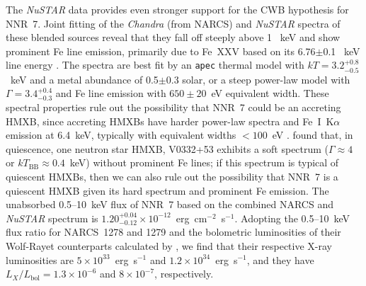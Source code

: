 \documentclass[iop,revtex4]{emulateapj}
\begin{document}
The \textit{NuSTAR} data provides even stronger support for the CWB hypothesis for NNR~7.  Joint fitting of the \textit{Chandra} (from NARCS) and \textit{NuSTAR} spectra of these blended sources reveal that they fall off steeply above 1~ keV and show prominent Fe line emission, primarily due to Fe~XXV based on its 6.76$\pm$0.1~ keV line energy \citep{house69}.  The spectra are best fit by an \texttt{apec} thermal model with $kT=3.2^{+0.8}_{-0.5}$~keV and a metal abundance of 0.5$\pm$0.3 solar, or a steep power-law model with $\Gamma=3.4^{+0.4}_{-0.3}$ and Fe line emission with $650\pm20$~eV equivalent width.  These spectral properties rule out the possibility that NNR~7 could be an accreting HMXB, since accreting HMXBs have harder power-law spectra and Fe~I~K$\alpha$ emission at 6.4~keV, typically with equivalent widths $<100$~eV \citep{torrejon10}.  \citet{elshamouty16} found that, in quiescence, one neutron star HMXB, V0332+53 exhibits a soft spectrum ($\Gamma\approx4$ or $kT_{\mathrm{BB}}\approx0.4$~keV) without prominent Fe lines; if this spectrum is typical of quiescent HMXBs, then we can also rule out the possibility that NNR~7 is a quiescent HMXB given its hard spectrum and prominent Fe emission.  The unabsorbed 0.5--10~keV flux of NNR~7 based on the combined NARCS and \textit{NuSTAR} spectrum\footnotemark{} is $1.20^{+0.04}_{-0.12}\times10^{-12}$~erg~cm$^{-2}$~s$^{-1}$.  Adopting the 0.5--10~keV flux ratio for NARCS~1278 and 1279 and the bolometric luminosities of their Wolf-Rayet counterparts calculated by \citet{rahoui14}, we find that their respective X-ray luminosities are $5\times10^{33}$~erg~s$^{-1}$ and $1.2\times10^{34}$~erg~s$^{-1}$, and they have $L_X/L_{\mathrm{bol}} = 1.3\times10^{-6}$ and $8\times10^{-7}$, respectively. \par
\end{document}
